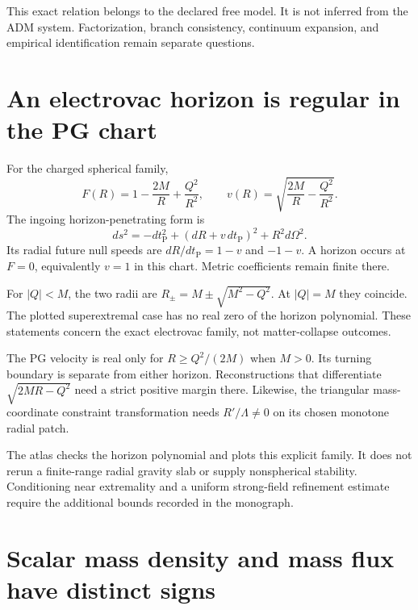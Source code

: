 This exact relation belongs to the declared free model. It is not inferred from the ADM system. Factorization, branch consistency, continuum expansion, and empirical identification remain separate questions.



\clearpage
\section{An electrovac horizon is regular in the PG chart}

For the charged spherical family,
\[
F(R)=1-\frac{2M}{R}+\frac{Q^2}{R^2},\qquad
v(R)=\sqrt{\frac{2M}{R}-\frac{Q^2}{R^2}}.
\]
The ingoing horizon-penetrating form is
\[
ds^2=-dt_{\mathrm P}^2+(dR+v\,dt_{\mathrm P})^2+R^2d\Omega^2.
\]
Its radial future null speeds are $dR/dt_{\mathrm P}=1-v$ and $-1-v$. A horizon occurs at $F=0$, equivalently $v=1$ in this chart. Metric coefficients remain finite there.

For $|Q|<M$, the two radii are $R_\pm=M\pm\sqrt{M^2-Q^2}$. At $|Q|=M$ they coincide. The plotted superextremal case has no real zero of the horizon polynomial. These statements concern the exact electrovac family, not matter-collapse outcomes.

The PG velocity is real only for $R\ge Q^2/(2M)$ when $M>0$. Its turning boundary is separate from either horizon. Reconstructions that differentiate $\sqrt{2MR-Q^2}$ need a strict positive margin there. Likewise, the triangular mass-coordinate constraint transformation needs $R'/\Lambda\ne0$ on its chosen monotone radial patch.

The atlas checks the horizon polynomial and plots this explicit family. It does not rerun a finite-range radial gravity slab or supply nonspherical stability. Conditioning near extremality and a uniform strong-field refinement estimate require the additional bounds recorded in the monograph.



\clearpage
\section{Scalar mass density and mass flux have distinct signs}

